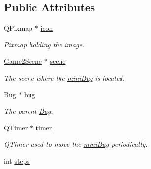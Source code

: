 \subsection*{Public Attributes}
\begin{DoxyCompactItemize}
\item 
\hypertarget{classminiBug_ab360b707ed5e40c2a74e3a8eabaf8514}{Q\-Pixmap $\ast$ \hyperlink{classminiBug_ab360b707ed5e40c2a74e3a8eabaf8514}{icon}}\label{classminiBug_ab360b707ed5e40c2a74e3a8eabaf8514}

\begin{DoxyCompactList}\small\item\em Pixmap holding the image. \end{DoxyCompactList}\item 
\hypertarget{classminiBug_ae013b5a05edb52ba47303fa601bac4a6}{\hyperlink{classGame2Scene}{Game2\-Scene} $\ast$ \hyperlink{classminiBug_ae013b5a05edb52ba47303fa601bac4a6}{scene}}\label{classminiBug_ae013b5a05edb52ba47303fa601bac4a6}

\begin{DoxyCompactList}\small\item\em The scene where the \hyperlink{classminiBug}{mini\-Bug} is located. \end{DoxyCompactList}\item 
\hypertarget{classminiBug_aa4f549ded50743ab672687685da28250}{\hyperlink{classBug}{Bug} $\ast$ \hyperlink{classminiBug_aa4f549ded50743ab672687685da28250}{bug}}\label{classminiBug_aa4f549ded50743ab672687685da28250}

\begin{DoxyCompactList}\small\item\em The parent \hyperlink{classBug}{Bug}. \end{DoxyCompactList}\item 
\hypertarget{classminiBug_a3e213df3a33778cf561e8eda60c5b43b}{Q\-Timer $\ast$ \hyperlink{classminiBug_a3e213df3a33778cf561e8eda60c5b43b}{timer}}\label{classminiBug_a3e213df3a33778cf561e8eda60c5b43b}

\begin{DoxyCompactList}\small\item\em Q\-Timer used to move the \hyperlink{classminiBug}{mini\-Bug} periodically. \end{DoxyCompactList}\item 
\hypertarget{classminiBug_a77b0631d176aba6eab8f7127b34e0e46}{int \hyperlink{classminiBug_a77b0631d176aba6eab8f7127b34e0e46}{steps}}\label{classminiBug_a77b0631d176aba6eab8f7127b34e0e46}


\end{DoxyCompactItemize}
